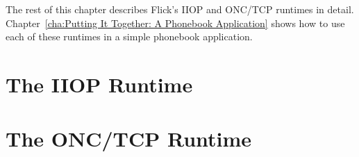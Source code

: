 The rest of this chapter describes Flick's IIOP and ONC/TCP runtimes in detail.
Chapter~\ref{cha:Putting It Together: A Phonebook Application} shows how to use
each of these runtimes in a simple phonebook application.



\section{The IIOP Runtime}
\label{sec:The IIOP Runtime}





\section{The ONC/TCP Runtime}
\label{sec:The ONC/TCP Runtime}






